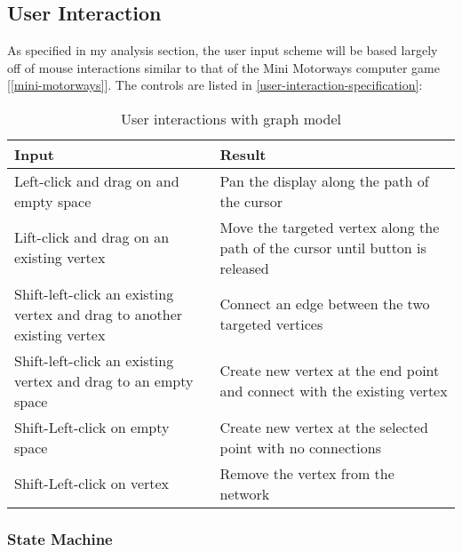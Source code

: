     \subsection{User Interaction}
    \label{subsection:user-interaction}

        As specified in my analysis section, the user input scheme will be based largely off of mouse interactions similar to that of the Mini Motorways computer game [\autoref{mini-motorways}]. The controls are listed in \autoref{user-interaction-specification}:

        \begin{table}
            \centering
            \begin{tabular}{|p{}|p{}|}
                \hline
                \textbf{Input} & \textbf{Result}\\
                \hline
                Left-click and drag on and empty space & Pan the display along the path of the cursor\\\hline

                Lift-click and drag on an existing vertex & Move the targeted vertex along the path of the cursor until button is released\\\hline

                Shift-left-click an existing vertex and drag to another existing vertex & Connect an edge between the two targeted vertices\\\hline

                Shift-left-click an existing vertex and drag to an empty space & Create new vertex at the end point and connect with the existing vertex\\\hline

                Shift-Left-click on empty space & Create new vertex at the selected point with no connections\\\hline

                Shift-Left-click on vertex & Remove the vertex from the network\\\hline
            \end{tabular}
            \caption{User interactions with graph model}
            \label{user-interaction-specification}
        \end{table}

        \subsubsection{State Machine}

